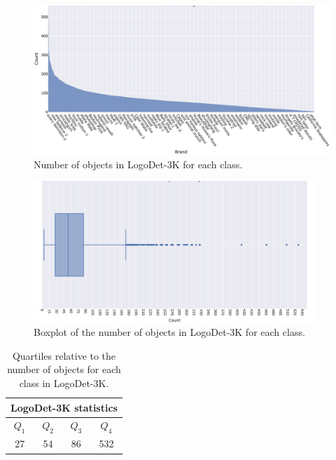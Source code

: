 \begin{figure}[H]
	\centering

    \begin{center}
        \includegraphics[width=\textwidth]{images/freq.jpeg}
    \end{center}
	\caption{Number of objects in LogoDet-3K for each class.}%
	\label{fig:logodet-dist}%
\end{figure}


\begin{figure}[H]
	\centering

    \begin{center}
        \includegraphics[width=0.95\textwidth]{images/box_plot.png}
    \end{center}
	\caption{Boxplot of the number of objects in LogoDet-3K for each class.}%
	\label{fig:logodet-boxplot}%
\end{figure}

\begin{table}[H]
    \centering
    \begin{tabular}{c  c  c  c } 
     \hline
     \multicolumn{4}{c}{LogoDet-3K statistics}\\
     \hline
     \textbf{$Q_1$} & \textbf{$Q_2$} & \textbf{$Q_3$} & \textbf{$Q_4$} \\
     \hline
     27 & 54 & 86 & 532 \\
    \end{tabular}
    \caption{Quartiles relative to the number of objects for each class in LogoDet-3K.}
    \label{table:logodet3k-quartile}
\end{table}

